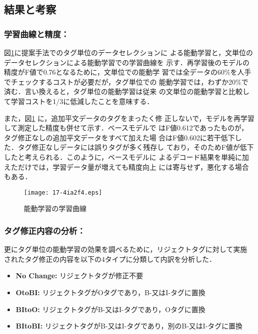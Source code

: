 \documentclass[japanese]{jnlp_1.4}
\begin{document}
\subsection{結果と考察}

\subsubsection{学習曲線と精度：}

図\ref{fig-learning-curve}に提案手法でのタグ単位のデータセレクションに
よる能動学習と，文単位のデータセレクションによる能動学習での学習曲線を
示す．再学習後のモデルの精度がF値で0.76となるために，文単位での能動学
習では全データの60\%を人手でチェックするコストが必要だが，タグ単位での
能動学習では，わずか20\%で済む．言い換えると，タグ単位の能動学習は従来
の文単位の能動学習と比較して学習コストを1/3に低減したことを意味する．

また，図\ref{fig-learning-curve} に，追加平文データのタグをまったく修
正しないで，モデルを再学習して測定した精度も併せて示す．ベースモデルで
はF値0.612であったものが，タグ修正なしの追加平文データをすべて加えた場
合はF値0.602に若干低下した．タグ修正なしデータには誤りタグが多く残存し
ており，そのためF値が低下したと考えられる．このように，ベースモデルに
よるデコード結果を単純に加えただけでは，学習データ量が増えても精度向上
には寄与せず，悪化する場合もある．


\begin{figure}[b]
\begin{center}
\texttt{[image: 17-4ia2f4.eps]}
\end{center}
\caption{能動学習の学習曲線}
\label{fig-learning-curve}
\end{figure}


\subsubsection{タグ修正内容の分析：}

更にタグ単位の能動学習の効果を調べるために，リジェクトタグに対して実施
されたタグ修正の内容を以下の4タイプに分類して内訳を分析した．

\begin{itemize}
\item {\bf No Change:} リジェクトタグが修正不要
\item {\bf OtoBI:} リジェクトタグがOタグであり，B-又はI-タグに置換
\item {\bf BItoO:} リジェクトタグがB-又はI-タグであり，Oタグに置換
\item {\bf BItoBI:} リジェクトタグがB-又はI-タグであり，別のB-又はI-タグに置換
\end{itemize}
\end{document}
